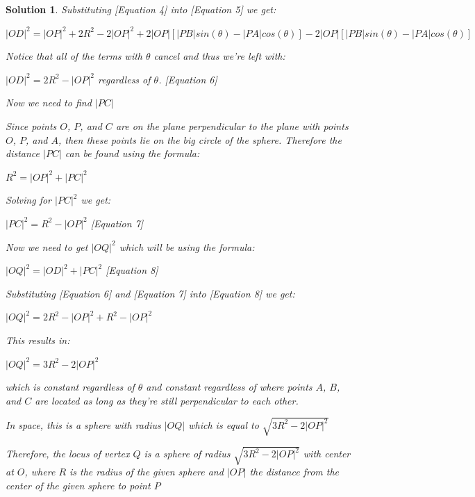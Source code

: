 \documentclass[12pt]{article}
\newtheorem*{solution*}{Solution}
\begin{document}
\begin{solution*}
Substituting [Equation 4] into [Equation 5] we get:

$\left| OD \right|^{2}=\left| OP \right|^{2}+2R^{2}-2\left| OP \right|^{2}+2\left| OP \right| \left[ \left| PB \right| sin(\theta) - \left| PA \right| cos(\theta) \right]-2\left| OP \right| \left[\left| PB \right|sin(\theta)-\left| PA \right|cos(\theta)  \right]$

Notice that all of the terms with $\theta$ cancel and thus we're left with:

$\left| OD \right|^{2}=2R^{2}-\left| OP \right|^{2}$ regardless of $\theta$. [Equation 6]

Now we need to find $\left| PC \right|$

Since points $O$, $P$, and $C$ are on the plane perpendicular to the plane with points $O$, $P$, and $A$, then these points lie on the big circle of the sphere. Therefore the distance $\left| PC \right|$ can be found using the formula:

$R^{2}=\left| OP \right|^{2}+\left| PC \right|^2$

Solving for $\left| PC \right|^2$ we get:

$\left| PC \right|^2=R^{2}-\left| OP \right|^{2}$ [Equation 7]

Now we need to get $\left| OQ \right|^{2}$ which will be using the formula:

$\left| OQ \right|^{2}=\left| OD \right|^{2}+\left| PC \right|^2$ [Equation 8]

Substituting [Equation 6] and [Equation 7] into [Equation 8] we get:

$\left| OQ \right|^{2}=2R^{2}-\left| OP \right|^{2}+R^{2}-\left| OP \right|^{2}$

This results in:

$\left| OQ \right|^{2}=3R^{2}-2\left| OP \right|^{2}$

which is constant regardless of $\theta$ and constant regardless of where points $A$, $B$, and $C$ are located as long as they're still perpendicular to each other.

In space, this is a sphere with radius $\left| OQ \right|$ which is equal to $\sqrt{3R^{2}-2\left| OP \right|^{2}}$

Therefore, the locus of vertex $Q$ is a sphere of radius $\sqrt{3R^{2}-2\left| OP \right|^{2}}$ with center at $O$, where $R$ is the radius of the given sphere and $\left| OP \right|$ the distance from the center of the given sphere to point $P$
\end{solution*}
\end{document}
